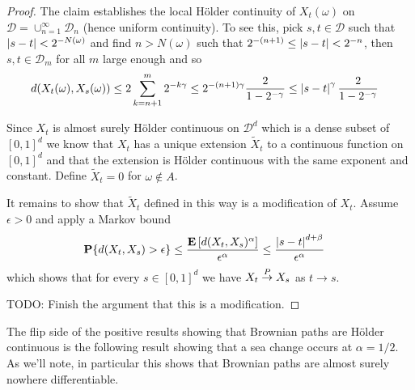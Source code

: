 \begin{proof}
The claim establishes the local H\"older continuity of $X_t(\omega)$
on $\mathcal{D} = \cup_{n=1}^\infty \mathcal{D}_n$ (hence uniform
continuity).  To see this, pick $s,t \in \mathcal{D}$ such that
$\left \vert s-t \right \vert < 2^{-N(\omega)}$ and find $n > N(\omega)$ such that
$2^{-(n+1)} \leq \left \vert s-t \right \vert < 2^{-n}$, then $s,t \in \mathcal{D}_m$ for all
$m$ large enough and so
\begin{align*}
d(X_t(\omega), X_s(\omega)) &\leq 2 \sum_{k=n+1}^m 2^{-k\gamma} \leq
2^{-(n+1)\gamma} \frac{2}{1 - 2^{-\gamma}}  \leq \left \vert s-t \right \vert^\gamma \frac{2}{1 - 2^{-\gamma}}
\end{align*}

Since $X_t$ is almost surely H\"older continuous on $\mathcal{D}^d$
which is a dense subset of $[0,1]^d$ we know that $X_t$ has a unique
extension $\tilde{X}_t$ to a continuous function on $[0,1]^d$ and that
the extension is H\"older continuous with the same exponent and
constant.  Define $\tilde{X}_t = 0$ for $\omega \notin A$.  

It remains to show that $\tilde{X}_t$ defined in this way is a
modification of $X_t$.
Assume $\epsilon
> 0$ and apply a Markov bound 
\begin{align*}
\textbf{P}\{d(X_t, X_s) > \epsilon\} &\leq \frac{\textbf{E}\left[d(X_t,
    X_s)^\alpha\right]}{\epsilon^\alpha} \leq \frac{\left \vert s-t \right \vert^{d + \beta}}{\epsilon^\alpha}
\end{align*}
which shows that for every $s \in [0,1]^d$ we have $X_t \overset{P}\to X_s$
as $t \to s$.

TODO: Finish the argument that this is a modification.
\end{proof}

The flip side of the positive results showing that Brownian paths are
H\"older continuous is the following result showing that a sea change
occurs at $\alpha = 1/2$.  As we'll note, in particular this shows
that Brownian paths are almost surely nowhere differentiable.

